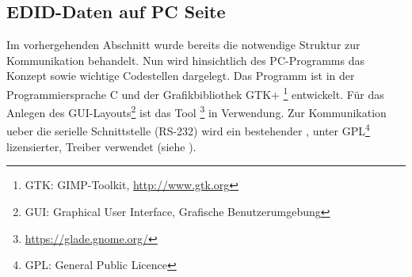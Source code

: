 \subsection{EDID-Daten auf PC Seite}
Im vorhergehenden Abschnitt wurde bereits die notwendige Struktur zur Kommunikation behandelt. Nun wird hinsichtlich des PC-Programms das Konzept sowie wichtige Codestellen dargelegt. Das Programm ist in der Programmiersprache C und der Grafikbibliothek GTK+ \footnote{GTK: GIMP-Toolkit, \url{http://www.gtk.org}} entwickelt. Für das Anlegen des GUI-Layouts\footnote{GUI: Graphical User Interface, Grafische Benutzerumgebung} ist das Tool \footnote{\url{https://glade.gnome.org/}} in Verwendung. Zur Kommunikation ueber die serielle Schnittstelle (RS-232) wird ein bestehender  , unter GPL\footnote{GPL: General Public Licence} lizensierter, Treiber verwendet (siehe \cite{rs232_lib}).

